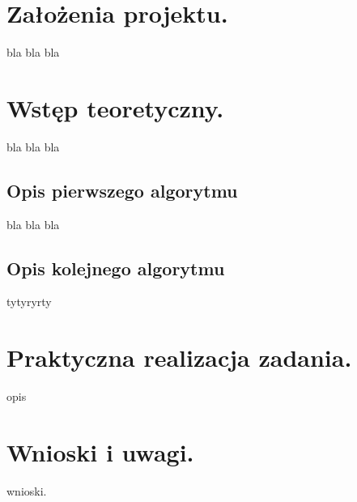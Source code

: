 \documentclass[a4paper, 11pt, titlepage]{article}
\begin{document}


\tableofcontents
\pagebreak[4]

\section{Założenia projektu.}
bla bla bla

\section{Wstęp teoretyczny.}
bla bla bla

\subsection{Opis pierwszego algorytmu}

bla bla bla

\subsection{Opis kolejnego algorytmu}

tytyryrty

\section{Praktyczna realizacja zadania.}

opis


\section{Wnioski i uwagi.}

wnioski.
\end{document}
